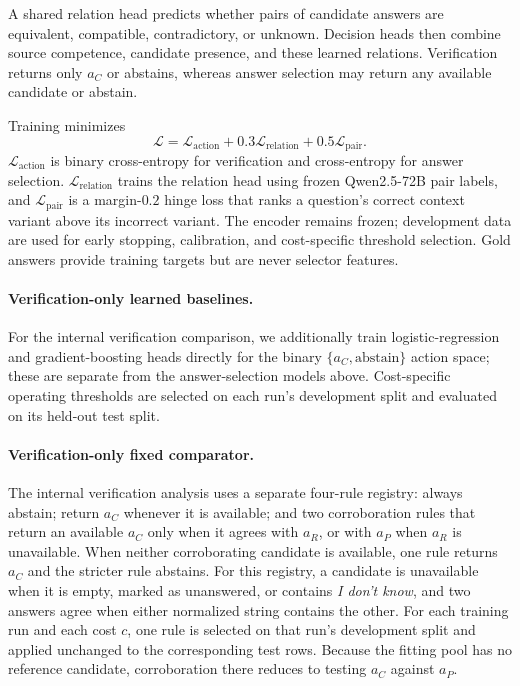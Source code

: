 \documentclass[sigconf]{acmart}
\newcommand{\ac}{a_C}
\newcommand{\ar}{a_R}
\newcommand{\ap}{a_P}
\begin{document}
A shared relation head predicts whether pairs of candidate answers are
equivalent, compatible, contradictory, or unknown. Decision heads then
combine source competence, candidate presence, and these learned
relations. Verification returns only $\ac$ or abstains, whereas answer
selection may return any available candidate or abstain.

Training minimizes
\begin{equation}
\mathcal L =
\mathcal L_{\mathrm{action}}
+0.3\mathcal L_{\mathrm{relation}}
+0.5\mathcal L_{\mathrm{pair}}.
\end{equation}
$\mathcal L_{\mathrm{action}}$ is binary cross-entropy for verification
and cross-entropy for answer selection.
$\mathcal L_{\mathrm{relation}}$ trains the relation head using frozen
Qwen2.5-72B pair labels, and $\mathcal L_{\mathrm{pair}}$ is a
margin-$0.2$ hinge loss that ranks a question's correct context
variant above its incorrect variant. The encoder remains frozen;
development data are used for early stopping, calibration, and
cost-specific threshold selection. Gold answers provide training
targets but are never selector features.

\paragraph{Verification-only learned baselines.}
For the internal verification comparison, we additionally train
logistic-regression and gradient-boosting heads directly for the binary
$\{\ac,\text{abstain}\}$ action space; these are separate from the
answer-selection models above. Cost-specific operating thresholds are
selected on each run's development split and evaluated on its held-out
test split.

\paragraph{Verification-only fixed comparator.}
\label{sec:verification-comparator}
The internal verification analysis uses a separate four-rule registry:
always abstain; return $\ac$ whenever it is available; and two
corroboration rules that return an available $\ac$ only when it agrees
with $\ar$, or with $\ap$ when $\ar$ is unavailable. When neither
corroborating candidate is available, one rule returns $\ac$ and the
stricter rule abstains. For this registry, a candidate is unavailable
when it is empty, marked as unanswered, or contains
\emph{I don't know}, and two answers agree when either normalized
string contains the other. For each training run and each cost $c$, one
rule is selected on that run's development split and applied unchanged
to the corresponding test rows. Because the fitting pool has no
reference candidate, corroboration there reduces to testing $\ac$
against $\ap$.
\end{document}
